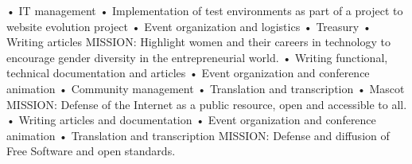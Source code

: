 \documentclass[
	a4paper,
]{fortysecondscv}
\begin{document}
\newpage
\makebacksidebar
\begin{cvtable}[3]
    {
        • IT management\newline
        • Implementation of test environments as part of a project to 
        website evolution project\newline
        • Event organization and logistics\newline
        • Treasury\newline
        • Writing articles\newline
        MISSION: Highlight women and their careers in technology to encourage
		gender diversity in the entrepreneurial world.\newline
    }
    {    
        • Writing functional, technical documentation and articles\newline
        • Event organization and conference animation\newline
        • Community management\newline
        • Translation and transcription\newline
        • Mascot\newline
        MISSION: Defense of the Internet as a public resource, open and 
		accessible to all.\newline
	}
    {
        • Writing articles and documentation\newline
        • Event organization and conference animation\newline
        • Translation and transcription\newline
        MISSION: Defense and diffusion of Free Software and open standards.
		\newline
    }
\end{cvtable}
\end{document}

